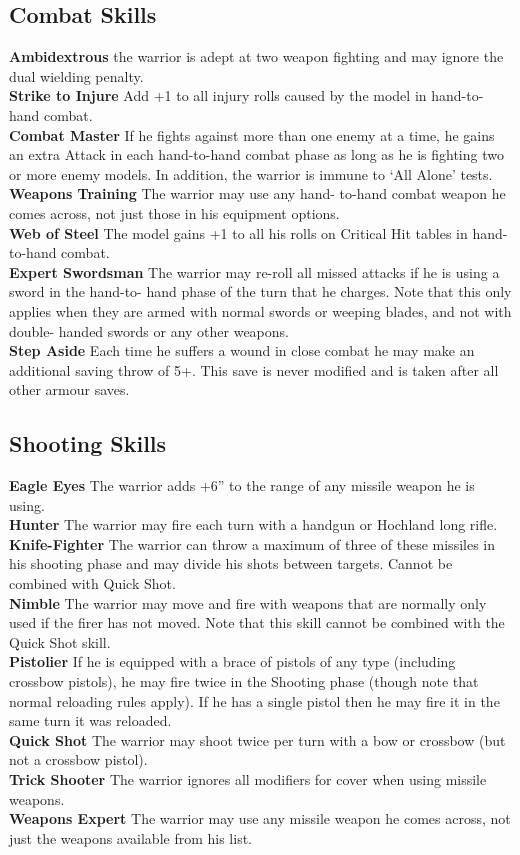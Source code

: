 \subsection*{Combat Skills}
\textbf{Ambidextrous} the warrior is adept at two weapon fighting and may ignore the dual wielding penalty. \\
\textbf{Strike to Injure} Add +1 to all injury rolls caused
by the model in hand-to-hand combat. \\
\textbf{Combat Master} If he fights against more than one
enemy at a time, he gains an extra Attack in each
hand-to-hand combat phase as long as he is fighting
two or more enemy models. In addition, the warrior
is immune to ‘All Alone’ tests. \\
\textbf{Weapons Training} The warrior may use any hand-
to-hand combat weapon he comes across, not just
those in his equipment options.\\
\textbf{Web of Steel} The model gains +1 to all his rolls on
Critical Hit tables in hand-to-hand combat. \\
\textbf{Expert Swordsman} The warrior may re-roll all
missed attacks if he is using a sword in the hand-to-
hand phase of the turn that he charges. Note that this
only applies when they are armed with normal
swords or weeping blades, and not with double-
handed swords or any other weapons. \\
\textbf{Step Aside} Each time he suffers a wound in close
combat he may make an additional saving throw of
5+. This save is never modified and is taken after all
other armour saves.
\subsection*{Shooting Skills}
\textbf{Eagle Eyes} The warrior adds +6” to the range of any missile weapon he is using. \\
\textbf{Hunter} The warrior may fire each turn with a handgun or Hochland long rifle. \\
\textbf{Knife-Fighter} The warrior can throw a maximum of three of these missiles in his shooting phase and may divide his shots between targets. Cannot be combined with Quick Shot. \\
\textbf{Nimble} The warrior may move and fire with weapons that are normally only used if the firer has not moved. Note that this skill cannot be combined with the Quick Shot skill. \\
\textbf{Pistolier} If he is equipped with a brace of pistols of any type (including crossbow pistols), he may fire twice in the Shooting phase (though note that normal reloading rules apply). If he has a single pistol then he may fire it in the same turn it was reloaded. \\
\textbf{Quick Shot} The warrior may shoot twice per turn with a bow or crossbow (but not a crossbow pistol). \\
\textbf{Trick Shooter} The warrior ignores all modifiers for cover when using missile weapons. \\
\textbf{Weapons Expert} The warrior may use any missile weapon he comes across, not just the weapons available from his list.

